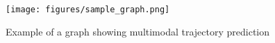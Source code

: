 \begin{figure}[htbp]
    \centering
    \texttt{[image: figures/sample\_graph.png]}
    \caption{Example of a graph showing multimodal trajectory prediction}
    \label{fig:sample_graph}
\end{figure}
